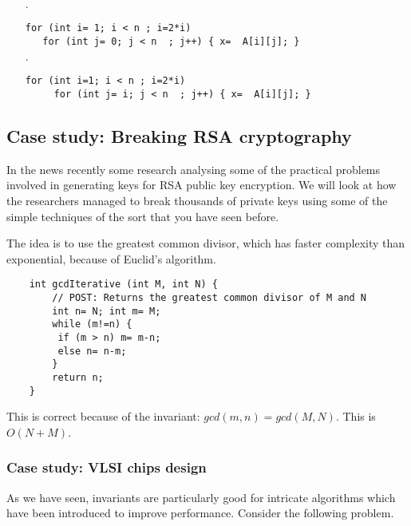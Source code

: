 \documentclass[twoside=false,DIV=14]{scrartcl}
\begin{document}
\begin{itemize}
\begin{itemize}
\item [$\cdot$]\begin{verbatim}
for (int i= 1; i < n ; i=2*i) 
   for (int j= 0; j < n  ; j++) { x=  A[i][j]; }
 \end{verbatim}
 
\item [$\cdot$]\begin{verbatim}
for (int i=1; i < n ; i=2*i) 
     for (int j= i; j < n  ; j++) { x=  A[i][j]; }
 \end{verbatim}

\end{itemize}

\end{itemize}

\subsection*{Case study: Breaking RSA cryptography}
In the news recently some research analysing some of the practical problems involved in generating keys for RSA public key encryption. We will look at how the researchers managed to break thousands of private keys using some of the simple techniques of the sort that you have seen before.

The idea is to use the greatest common divisor, which has faster complexity than exponential, because of Euclid's algorithm.

 \begin{verbatim}
	int gcdIterative (int M, int N) {
		// POST: Returns the greatest common divisor of M and N
		int n= N; int m= M;
		while (m!=n) {
		 if (m > n) m= m-n;
		 else n= n-m;
		}
		return n;
	}
\end{verbatim}

This is correct because of the invariant: $\textit{gcd}(m, n) = \textit{gcd}(M, N)$.
This is $O(N + M)$.


\subsubsection*{Case study: VLSI chips design}
As we have seen, invariants are particularly good for intricate algorithms which have been introduced to improve performance.  Consider the following problem.
\end{document}
